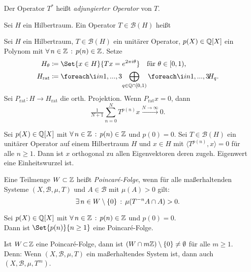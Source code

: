 \documentclass{cheat-sheet}
\newcommand{\nspace}[1]{\foreach \i in {1,...,#1}{ \! }} %
\newcommand{\Bor}{\mathcal{B}} %
\newcommand{\meST}{$(X, \Bor, \mu, T)$} %
\newcommand{\Boun}{\mathcal{B}} %
\newcommand{\scp}[2]{\langle #1 , #2 \rangle} %
\begin{document}
\begin{defn}
  Der Operator $T^*$ heißt \emph{adjungierter Operator} von $T$.
\end{defn}

\begin{defn}
  Sei $H$ ein Hilbertraum.
  Ein Operator $T \in \Boun(H)$ heißt \\
   \enspace
\end{defn}


\begin{lem}
  Sei $H$ ein Hilbertraum, $T \in \Boun(H)$ ein unitärer Operator, $p(X) \in \mathbb{Q}[X]$ ein Polynom mit $\forall \, {n \in \mathbb{Z}} \,:\, p(n) \in \mathbb{Z}$. Setze
  \begin{align*}
    H_\theta & \coloneqq \Set{x \in H}{Tx = e^{2 \pi i \theta}} \quad
    \text{für $\theta \in \cointerval{0}{1}$,} \\
    H_{\text{rat}} & \coloneqq \nspace{3} \bigoplus_{q \in \Q \cap \cointerval{0}{1}} \nspace{3} H_q.
  \end{align*}
  Sei $P_{\text{rat}} : H \to H_{\text{rat}}$ die orth. Projektion. Wenn $P_{\text{rat}} x = 0$, dann
  \[ \tfrac{1}{N + 1} \sum_{n=0}^N T^{p(n)} x \xrightarrow{N \to \infty} 0. \]
\end{lem}

\begin{prop}
  Sei $p(X) \in \mathbb{Q}[X]$ mit $\forall \, {n \in \mathbb{Z}} \,:\, p(n) \in \mathbb{Z}$ und $p(0) = 0$.
  Sei $T \in \Boun(H)$ ein unitärer Operator auf einem Hilbertraum $H$ und $x \in H$ mit $\scp{T^{p(n)}}{x} = 0$ für alle $n \geq 1$. Dann ist $x$ orthogonal zu allen Eigenvektoren deren zugeh. Eigenwert eine Einheitswurzel ist.
\end{prop}

\begin{defn}
  Eine Teilmenge $W \subset \mathbb{Z}$ heißt \emph{Poincaré-Folge}, wenn für alle maßerhaltenden Systeme \meST{} und $A \in \Bor$ mit $\mu(A) > 0$ gilt:
  \[ \exists \, {n \in W \setminus \{ 0 \}} \,:\, \mu(T^{-n} A \cap A) > 0. \]
\end{defn}

\begin{thm}
  Sei $p(X) \in \mathbb{Q}[X]$ mit $\forall \, {n \in \mathbb{Z}} \,:\, p(n) \in \mathbb{Z}$ und $p(0) = 0$. \\
  Dann ist $\Set{p(n)}{n \geq 1}$ eine Poincaré-Folge.
\end{thm}

\begin{bem}
  Ist $W \!\subset\! \mathbb{Z}$ eine Poincaré-Folge, dann ist $(W \cap m \mathbb{Z}) \setminus \{ 0 \} \not= \emptyset$ für alle $m \geq 1$.
  Denn: Wenn \meST{} ein maßerhaltendes System ist, dann auch $(X, \Bor, \mu, T^m)$.
\end{bem}
\end{document}
